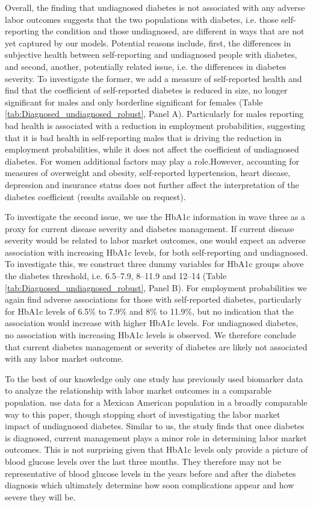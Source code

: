 \documentclass[12pt,english]{article}
\begin{document}
Overall, the finding that undiagnosed diabetes is not associated with any adverse labor outcomes suggests that the two populations with diabetes, i.e. those self-reporting the condition and those undiagnosed, are different in ways that are not yet captured by our models. Potential reasons include, first, the differences in subjective health between self-reporting and undiagnosed people with diabetes, and second, another, potentially related issue, i.e. the differences in diabetes severity. To investigate the former, we add a measure of self-reported health and find that the coefficient of self-reported diabetes is reduced in size, no longer significant for males and only borderline significant for females (Table \ref{tab:Diagnosed_undiagnosed_robust}, Panel A). Particularly for males reporting bad health is associated with a reduction in employment probabilities, suggesting that it is bad health in self-reporting males that is driving the reduction in employment probabilities, while it does not affect the coefficient of undiagnosed diabetes. For women additional factors may play a role.However, accounting for measures of overweight and obesity, self-reported hypertension, heart disease, depression and insurance status does not further affect the interpretation of the diabetes coefficient (results available on request).


To investigate the second issue, we use the \ac{HbA1c} information in wave three as a proxy for current disease
severity and diabetes management. If current disease severity would be related to labor market outcomes, one would expect an adverse association with increasing \ac{HbA1c} levels, for both self-reporting and undiagnosed. To investigate this, we construct three dummy variables for \ac{HbA1c} groups above the
diabetes threshold, i.e. 6.5--7.9, 8--11.9 and 12--14 (Table \ref{tab:Diagnosed_undiagnosed_robust}, Panel B). For employment probabilities we again find adverse associations for
those with self-reported diabetes, particularly for \ac{HbA1c} levels of 6.5\% to 7.9\%
and 8\% to 11.9\%, but no indication that the association would increase with higher \ac{HbA1c} levels. For undiagnosed diabetes, no association with increasing \ac{HbA1c} levels is observed. We therefore conclude that current diabetes management or severity of diabetes are likely not associated with any labor market outcome.

To the best of our knowledge only one study has previously used biomarker data to analyze the relationship with labor market outcomes in a comparable population. \textcite{BrownIII2011} use data for a Mexican American
population in a broadly comparable way to this paper, though stopping short of investigating
the labor market impact of undiagnosed diabetes. Similar to us, the study finds that once diabetes is diagnosed, current management plays a minor role in determining labor market outcomes. This is not surprising given that \ac{HbA1c} levels only provide a picture of blood glucose levels over the last three months. They therefore may not be representative of blood glucose levels in the years before and after the diabetes diagnosis which ultimately determine how soon complications appear and how severe they will be.
\end{document}
